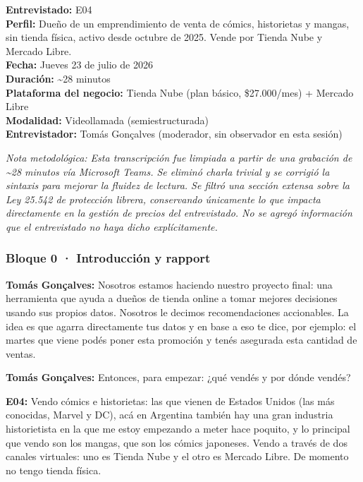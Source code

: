 ﻿
\noindent\textbf{Entrevistado:} E04\\
\noindent\textbf{Perfil:} Dueño de un emprendimiento de venta de cómics, historietas y mangas, sin tienda física, activo desde octubre de 2025. Vende por Tienda Nube y Mercado Libre.\\
\noindent\textbf{Fecha:} Jueves 23 de julio de 2026\\
\noindent\textbf{Duración:} \textasciitilde28 minutos\\
\noindent\textbf{Plataforma del negocio:} Tienda Nube (plan básico, \$27.000/mes) + Mercado Libre\\
\noindent\textbf{Modalidad:} Videollamada (semiestructurada)\\
\noindent\textbf{Entrevistador:} Tomás Gonçalves (moderador, sin observador en esta sesión)

\begin{framed}
\small\noindent\textit{Nota metodológica: Esta transcripción fue limpiada a partir de una grabación de \textasciitilde28 minutos vía Microsoft Teams. Se eliminó charla trivial y se corrigió la sintaxis para mejorar la fluidez de lectura. Se filtró una sección extensa sobre la Ley 25.542 de protección librera, conservando únicamente lo que impacta directamente en la gestión de precios del entrevistado. No se agregó información que el entrevistado no haya dicho explícitamente.}
\end{framed}

\subsubsection*{Bloque 0 · Introducción y rapport}

\noindent\textbf{Tomás Gonçalves:} Nosotros estamos haciendo nuestro proyecto final: una herramienta que ayuda a dueños de tienda online a tomar mejores decisiones usando sus propios datos. Nosotros le decimos recomendaciones accionables. La idea es que agarra directamente tus datos y en base a eso te dice, por ejemplo: el martes que viene podés poner esta promoción y tenés asegurada esta cantidad de ventas.

\noindent\textbf{Tomás Gonçalves:} Entonces, para empezar: ¿qué vendés y por dónde vendés?

\noindent\textbf{E04:} Vendo cómics e historietas: las que vienen de Estados Unidos (las más conocidas, Marvel y DC), acá en Argentina también hay una gran industria historietista en la que me estoy empezando a meter hace poquito, y lo principal que vendo son los mangas, que son los cómics japoneses. Vendo a través de dos canales virtuales: uno es Tienda Nube y el otro es Mercado Libre. De momento no tengo tienda física.

